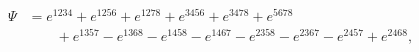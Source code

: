 \begin{equation}
\label{Psidef}
\begin{split}
   \Psi &= e^{1234}+e^{1256}+e^{1278}+e^{3456}+e^{3478}+e^{5678} \\
      &\qquad + e^{1357}-e^{1368}-e^{1458}-e^{1467}-e^{2358}
          -e^{2367}-e^{2457}+e^{2468} ,
\end{split}
\end{equation}

